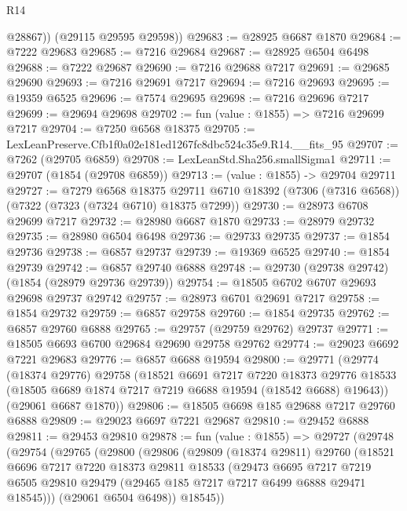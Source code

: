 \begin{lexlean}{R14}
\begin{coremodule}
          @28867))
      (@29115 @29595 @29598))
@29683 := @28925 @6687 @1870
@29684 := @7222 @29683
@29685 := @7216 @29684
@29687 := @28925 @6504 @6498
@29688 := @7222 @29687
@29690 := @7216 @29688 @7217
@29691 := @29685 @29690
@29693 := @7216 @29691 @7217
@29694 := @7216 @29693
@29695 := @19359 @6525
@29696 := @7574 @29695
@29698 := @7216 @29696 @7217
@29699 := @29694 @29698
@29702 := fun (value : @1855) => @7216 @29699 @7217
@29704 := @7250 @6568 @18375
@29705 := LexLeanPreserve.Cfb1f0a02e181ed1267fc8dbc524c35e9.R14.__fits_95
@29707 := @7262 (@29705 @6859)
@29708 := LexLeanStd.Sha256.smallSigma1
@29711 := @29707 (@1854 (@29708 @6859))
@29713 := (value : @1855) -> @29704 @29711
@29727 := @7279
    @6568
    @18375
    @29711
    @6710
    @18392
    (@7306 (@7316 @6568))
    (@7322 (@7323 (@7324 @6710) @18375 @7299))
@29730 := @28973 @6708 @29699 @7217
@29732 := @28980 @6687 @1870
@29733 := @28979 @29732
@29735 := @28980 @6504 @6498
@29736 := @29733 @29735
@29737 := @1854 @29736
@29738 := @6857 @29737
@29739 := @19369 @6525
@29740 := @1854 @29739
@29742 := @6857 @29740 @6888
@29748 := @29730 (@29738 @29742) (@1854 (@28979 @29736 @29739))
@29754 := @18505 @6702 @6707 @29693 @29698 @29737 @29742
@29757 := @28973 @6701 @29691 @7217
@29758 := @1854 @29732
@29759 := @6857 @29758
@29760 := @1854 @29735
@29762 := @6857 @29760 @6888
@29765 := @29757 (@29759 @29762) @29737
@29771 := @18505 @6693 @6700 @29684 @29690 @29758 @29762
@29774 := @29023 @6692 @7221 @29683
@29776 := @6857 @6688 @19594
@29800 := @29771
    (@29774
      (@18374 @29776)
      @29758
      (@18521
        @6691
        @7217
        @7220
        @18373
        @29776
        @18533
        (@18505 @6689 @1874 @7217 @7219 @6688 @19594 (@18542 @6688) @19643))
      (@29061 @6687 @1870))
@29806 := @18505 @6698 @185 @29688 @7217 @29760 @6888
@29809 := @29023 @6697 @7221 @29687
@29810 := @29452 @6888
@29811 := @29453 @29810
@29878 := fun (value : @1855) =>
  @29727
    (@29748
      (@29754
        (@29765
          (@29800
            (@29806
              (@29809
                (@18374 @29811)
                @29760
                (@18521
                  @6696
                  @7217
                  @7220
                  @18373
                  @29811
                  @18533
                  (@29473
                    @6695
                    @7217
                    @7219
                    @6505
                    @29810
                    @29479
                    (@29465 @185 @7217 @7217 @6499 @6888 @29471 @18545)))
                (@29061 @6504 @6498))
              @18545))

\end{coremodule}
\end{lexlean}
